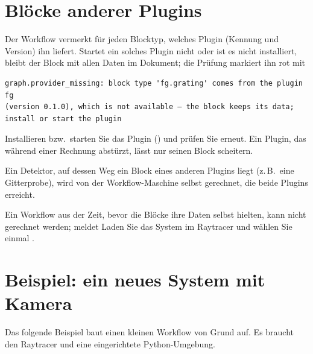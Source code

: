 \section{Blöcke anderer Plugins}\label{sec:workflow-anbieter}

Der Workflow vermerkt für jeden Blocktyp, welches Plugin (Kennung und Version) ihn liefert.
Startet ein solches Plugin nicht oder ist es nicht installiert, bleibt der Block mit allen Daten im
Dokument; die Prüfung markiert ihn rot mit

\begin{lstlisting}
graph.provider_missing: block type 'fg.grating' comes from the plugin fg
(version 0.1.0), which is not available – the block keeps its data;
install or start the plugin
\end{lstlisting}

Installieren bzw.\ starten Sie das Plugin () und prüfen Sie erneut.
Ein Plugin, das während einer Rechnung abstürzt, lässt nur seinen Block scheitern.

Ein Detektor, auf dessen Weg ein Block eines anderen Plugins liegt (z.\,B.\ eine Gitterprobe),
wird von der Workflow-Maschine selbst gerechnet, die beide Plugins erreicht.

\begin{hinweis}
Ein Workflow aus der Zeit, bevor die Blöcke ihre Daten selbst hielten, kann nicht gerechnet
werden;  meldet  Laden Sie das System im Raytracer und wählen Sie einmal .
\end{hinweis}

\section{Beispiel: ein neues System mit Kamera}\label{sec:workflow-beispiel}

Das folgende Beispiel baut einen kleinen Workflow von Grund auf. Es braucht den Raytracer und eine
eingerichtete Python-Umgebung.

